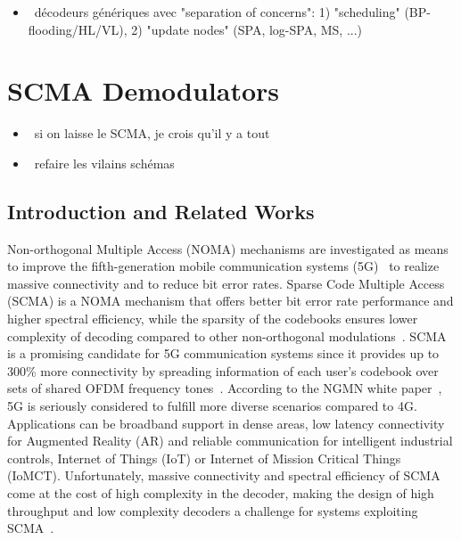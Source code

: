 \begin{itemize}
  \item \xmark~décodeurs génériques avec "separation of concerns":
    1) "scheduling" (BP-flooding/HL/VL), 2) "update nodes" (SPA, log-SPA, MS,
    ...)
\end{itemize}

\section{SCMA Demodulators}

\begin{itemize}
  \item \cmark~si on laisse le SCMA, je crois qu'il y a tout
  \item \xmark~refaire les vilains schémas
\end{itemize}

\subsection{Introduction and Related Works}

Non-orthogonal Multiple Access (NOMA) mechanisms are investigated as means to
improve the fifth-generation mobile communication systems (5G)~\cite{Islam2017}
to realize massive connectivity and to reduce bit error rates. Sparse Code
Multiple Access (SCMA) is a NOMA mechanism that offers better bit error rate
performance and higher spectral efficiency, while the sparsity of the codebooks
ensures lower complexity of decoding compared to other non-orthogonal
modulations~\cite{Nikopour2013}. SCMA is a promising candidate for 5G
communication systems since it provides up to 300\% more connectivity by
spreading information of each user's codebook over sets of shared OFDM frequency
tones~\cite{Altera2015}. According to the NGMN white paper~\cite{Alliance2015},
5G is seriously considered to fulfill more diverse scenarios compared to 4G.
Applications can be broadband support in dense areas, low latency connectivity
for Augmented Reality (AR) and reliable communication for intelligent industrial
controls, Internet of Things (IoT) or Internet of Mission Critical Things
(IoMCT). Unfortunately, massive connectivity and spectral efficiency of SCMA
come at the cost of high complexity in the decoder, making the design of high
throughput and low complexity decoders a challenge for systems exploiting
SCMA~\cite{Lu2015}.

